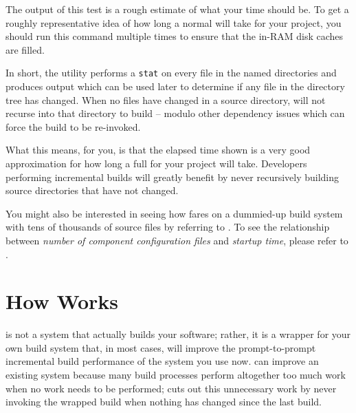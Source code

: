 \begin{center}\end{center}


The output of this test is a rough estimate of what your \nullbuild
time should be.  To get a roughly representative idea of how long a
normal \nullbuild will take for your project, you should run this
command multiple times to ensure that the in-RAM disk caches are
filled.

In short, the \mtree utility performs a \texttt{stat} on every file in
the named directories and produces output which can be used later to
determine if any file in the directory tree has changed.  When no files
have changed in a source directory, \lmsbw will not recurse into that
directory to build -- modulo other dependency issues which can force
the build to be re-invoked.

What this means, for you, is that the elapsed time shown is a very
good approximation for how long a full \nullbuild for your project
will take.  Developers performing incremental builds will greatly
benefit by never recursively building source directories that have not
changed.

You might also be interested in seeing how \lmsbw fares on a
dummied-up build system with tens of thousands of source files by
referring to .  To see the relationship between
\emph{number of component configuration files} and \emph{\lmsbw
  startup time}, please refer to .

\section{How \lmsbw Works}

\lmsbw is not a system that actually builds your software; rather, it
is a wrapper for your own build system that, in most cases, will
improve the prompt-to-prompt incremental build performance of the
system you use now.  \lmsbw can improve an existing system because
many build processes perform altogether too much work when no work
needs to be performed; \lmsbw cuts out this unnecessary work by never
invoking the wrapped build when nothing has changed since the last
build.

